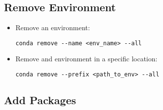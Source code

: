 \subsection{Remove Environment}

\begin{itemize}
    \item Remove an environment:
    \begin{verbatim}
conda remove --name <env_name> --all
    \end{verbatim}
    \item Remove and environment in a specific location:
    \begin{verbatim}
conda remove --prefix <path_to_env> --all
    \end{verbatim}
\end{itemize}


\subsection{Add Packages}

